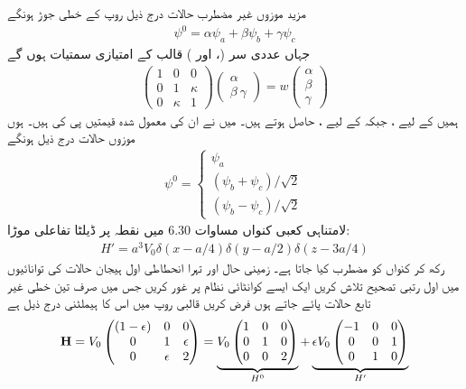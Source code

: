 مزید موزوں غیر مضطرب حالات درج ذیل روپ کے خطی جوڑ ہونگے 
\begin{align}
\psi^0 = \alpha \psi_a + \beta \psi_b + \gamma \psi_c 
\end{align}
جہاں عددی سر (،   اور )  قالب  کے امتیازی سمتیات  ہوں گے 
\begin{align*}
\begin{pmatrix}
1 & 0 & 0 \\
0 & 1 & \kappa \\
0 & \kappa & 1
\end{pmatrix}
\begin{pmatrix}
\alpha \\
\beta \
\gamma
\end{pmatrix}
= w 
\begin{pmatrix}
\alpha \\
\beta \\
\gamma
\end{pmatrix}
\end{align*}
ہمیں  کے لیے  ،  جبکہ   کے لیے ،  حاصل ہوتے ہیں۔ میں نے ان کی معمول شدہ قیمتیں پی کی ہیں۔ ہوں موزوں حالات درج ذیل ہونگے 
\begin{align}
\psi^0 =
\begin{cases}
\psi_a \\
(\psi_b + \psi_c)/ \sqrt{2} \\
(\psi_b - \psi_c)/ \sqrt{2}
\end{cases}
\end{align}
لامتناہی کعبی کنواں مساوات 6.30 میں نقطہ  پر ڈیلٹا تفاعلی موڑا:
\begin{align*}
H' = a^3 V_0 \delta (x - a/4) \delta (y - a/2) \delta (z - 3a/4)
\end{align*}
 رکھ کر کنواں کو مضطرب کیا جاتا ہے۔ زمینی حال اور تہرا انحطاطی اول ہیجان حالات کی توانائیوں میں اول رتبی تصحیح تلاش کریں
\انتہا{سوال}
ایک ایسے کوانٹائی نظام پر غور کریں جس میں صرف تین خطی غیر تابع حالات پائے جاتے ہوں فرض کریں قالبی روپ میں اس کا ہیملٹنی درج ذیل ہے
\begin{align*}
\bold{H} = V_0 
\begin{pmatrix}
(1 - \epsilon) & 0 & 0 \\
0 & 1 & \epsilon \\
0 & \epsilon & 2
\end{pmatrix}
= \underbrace{V_0 
\begin{pmatrix}
1 & 0 & 0 \\
0 & 1 & 0 \\
0 & 0 & 2
\end{pmatrix}}_{H^0} 
+ \underbrace{\epsilon V_0 
\begin{pmatrix}
-1 & 0 & 0 \\
0 & 0 & 1 \\
0 & 1 & 0
\end{pmatrix}}_{H'}
\end{align*}

